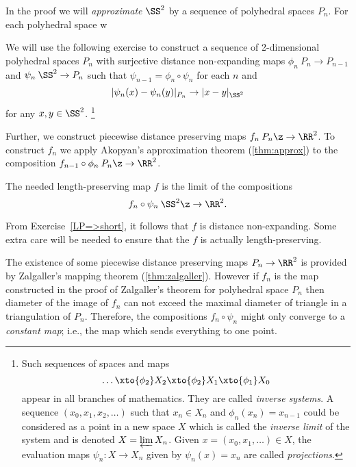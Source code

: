 


In the proof we will \emph{approximate} $\SS^2$ by a sequence of polyhedral spaces $P_n$.
For each polyhedral space w 

We will use the following exercise 
to construct a sequence of 2-dimensional polyhedral spaces $P_n$ with surjective distance non-expanding maps $\phi_n\:P_n\to P_{n-1}$
and $\psi_n\:\SS^2\to P_n$ such that
$\psi_{n-1}=\phi_n\circ\psi_n$ for each $n$ 
and 
$$|\psi_n(x)-\psi_n(y)|_{P_n}\to |x-y|_{\SS^2}$$
for any $x,y\in \SS^2$.%
\footnote{Such sequences of spaces and maps 
$$\dots\xto{\phi_{2}}X_2\xto{\phi_{2}} X_1\xto{\phi_{1}}X_0$$
appear in all branches of mathematics. 
They are called \emph{inverse systems}.
A sequence $(x_0, x_1, x_2, \ldots)$ such that $x_n \in X_n$ and $\phi_n(x_n)=x_{n-1}$ could be considered as a point in a new space $X$ which is called the \emph{inverse limit} of the system and is denoted $X=\varprojlim X_n$. 
Given $x=(x_0,x_1,\dots )\in X$, the evaluation maps $\psi_n: X \to X_n$ given by $\psi_n(x)=x_n$ are called \emph{projections}.}



Further, we construct piecewise distance preserving maps $f_n\:P_n\z\to\RR^2$.
To construct $f_n$ we apply Akopyan's approximation theorem (\ref{thm:approx}) to the composition $f_{n-1}\circ\phi_n\:P_n\z\to\RR^2$.

The needed length-preserving map $f$ is  the limit of the compositions 
$$f_n\circ\psi_n\:\SS^2\z\to\RR^2.$$

From Exercise~\ref{LP=>short},
it follows that $f$ is distance non-expanding.
Some extra care will be needed to ensure that the  $f$ is actually length-preserving.

The existence of some piecewise distance preserving maps $P_n\to\RR^2$ is provided by Zalgaller's mapping theorem (\ref{thm:zalgaller}).
However if $f_n$ is the map constructed in the proof of Zalgaller's theorem for polyhedral space $P_n$
then diameter of the image of $f_n$ can not exceed the maximal diameter of triangle in a triangulation of $P_n$.
Therefore, the compositions $f_n\circ\psi_n$ 
might only converge to a \emph{constant map};
i.e., the map which sends everything to one point.



















